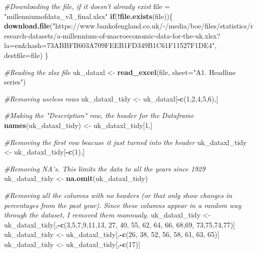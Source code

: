 \documentclass[]{article}
\newenvironment{Shaded}{\begin{snugshade}}{\end{snugshade}}
\newcommand{\KeywordTok}[1]{\textcolor[rgb]{0.13,0.29,0.53}{\textbf{#1}}}
\newcommand{\DataTypeTok}[1]{\textcolor[rgb]{0.13,0.29,0.53}{#1}}
\newcommand{\DecValTok}[1]{\textcolor[rgb]{0.00,0.00,0.81}{#1}}
\newcommand{\StringTok}[1]{\textcolor[rgb]{0.31,0.60,0.02}{#1}}
\newcommand{\CommentTok}[1]{\textcolor[rgb]{0.56,0.35,0.01}{\textit{#1}}}
\newcommand{\ControlFlowTok}[1]{\textcolor[rgb]{0.13,0.29,0.53}{\textbf{#1}}}
\newcommand{\OperatorTok}[1]{\textcolor[rgb]{0.81,0.36,0.00}{\textbf{#1}}}
\newcommand{\NormalTok}[1]{#1}
\begin{document}
\begin{Shaded}
\begin{Highlighting}[]
\CommentTok{#Downloading the file, if it doesn't already exist}
\NormalTok{file =}\StringTok{ "millenniumofdata_v3_final.xlsx"}
\ControlFlowTok{if}\NormalTok{(}\OperatorTok{!}\KeywordTok{file.exists}\NormalTok{(file))\{}
  \KeywordTok{download.file}\NormalTok{(}\StringTok{"https://www.bankofengland.co.uk/-/media/boe/files/statistics/research-datasets/a-millennium-of-macroeconomic-data-for-the-uk.xlsx?la=en&hash=73ABBFB603A709FEEB1FD349B1C61F11527F1DE4"}\NormalTok{, }\DataTypeTok{destfile=}\NormalTok{file)}
\NormalTok{\}}

\CommentTok{#Reading the xlsx file}
\NormalTok{uk_dataxl <-}\StringTok{  }\KeywordTok{read_excel}\NormalTok{(file, }\DataTypeTok{sheet=}\StringTok{"A1. Headline series"}\NormalTok{)}

\CommentTok{#Removing useless rows}
\NormalTok{uk_dataxl_tidy <-}\StringTok{ }\NormalTok{uk_dataxl[}\OperatorTok{-}\KeywordTok{c}\NormalTok{(}\DecValTok{1}\NormalTok{,}\DecValTok{2}\NormalTok{,}\DecValTok{4}\NormalTok{,}\DecValTok{5}\NormalTok{,}\DecValTok{6}\NormalTok{),]}

\CommentTok{#Making the "Description" row, the header for the Dataframe}
\KeywordTok{names}\NormalTok{(uk_dataxl_tidy) <-}\StringTok{ }\NormalTok{uk_dataxl_tidy[}\DecValTok{1}\NormalTok{,]}

\CommentTok{#Removing the first row beacuse it just turned into the header}
\NormalTok{uk_dataxl_tidy <-}\StringTok{ }\NormalTok{uk_dataxl_tidy[}\OperatorTok{-}\KeywordTok{c}\NormalTok{(}\DecValTok{1}\NormalTok{),]}

\CommentTok{#Removing NA's. This limits the data to all the years since 1929}
\NormalTok{uk_dataxl_tidy <-}\StringTok{ }\KeywordTok{na.omit}\NormalTok{(uk_dataxl_tidy)}

\CommentTok{#Removing all the columns with no headers (or that only show changes in percentages from the past year). Since these columns appear in a random way through the dataset, I removed them mannualy.}
\NormalTok{uk_dataxl_tidy <-}\StringTok{ }\NormalTok{uk_dataxl_tidy[,}\OperatorTok{-}\KeywordTok{c}\NormalTok{(}\DecValTok{3}\NormalTok{,}\DecValTok{5}\NormalTok{,}\DecValTok{7}\NormalTok{,}\DecValTok{9}\NormalTok{,}\DecValTok{11}\NormalTok{,}\DecValTok{13}\NormalTok{, }\DecValTok{27}\NormalTok{, }\DecValTok{40}\NormalTok{, }\DecValTok{55}\NormalTok{, }\DecValTok{62}\NormalTok{, }\DecValTok{64}\NormalTok{, }\DecValTok{66}\NormalTok{, }\DecValTok{68}\NormalTok{,}\DecValTok{69}\NormalTok{, }\DecValTok{73}\NormalTok{,}\DecValTok{75}\NormalTok{,}\DecValTok{74}\NormalTok{,}\DecValTok{77}\NormalTok{)]}
\NormalTok{uk_dataxl_tidy <-}\StringTok{ }\NormalTok{uk_dataxl_tidy[,}\OperatorTok{-}\KeywordTok{c}\NormalTok{(}\DecValTok{26}\NormalTok{, }\DecValTok{38}\NormalTok{, }\DecValTok{52}\NormalTok{, }\DecValTok{56}\NormalTok{, }\DecValTok{58}\NormalTok{, }\DecValTok{61}\NormalTok{, }\DecValTok{63}\NormalTok{, }\DecValTok{65}\NormalTok{)]}
\NormalTok{uk_dataxl_tidy <-}\StringTok{ }\NormalTok{uk_dataxl_tidy[,}\OperatorTok{-}\KeywordTok{c}\NormalTok{(}\DecValTok{17}\NormalTok{)]}


\end{Highlighting}
\end{Shaded}
\end{document}

